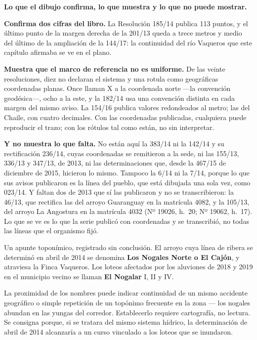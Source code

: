 \begin{cautela}
\textbf{Lo que el dibujo confirma, lo que muestra y lo que no puede mostrar.}

\textbf{Confirma dos cifras del libro.} La Resolución 185/14 publica 113 puntos, y el último punto de la margen derecha de la 201/13 queda a trece metros y medio del último de la ampliación de la 144/17: la continuidad del río Vaqueros que este capítulo afirmaba se ve en el plano.

\textbf{Muestra que el marco de referencia no es uniforme.} De las veinte resoluciones, diez no declaran el sistema y una rotula como geográficas coordenadas planas. Once llaman X a la coordenada norte ---la convención geodésica---, ocho a la este, y la 182/14 usa una convención distinta en cada margen del mismo aviso. La 154/16 publica valores redondeados al metro; las del Chaile, con cuatro decimales. Con las coordenadas publicadas, cualquiera puede reproducir el trazo; con los rótulos tal como están, no sin interpretar.

\textbf{Y no muestra lo que falta.} No están aquí la 383/14 ni la 142/14 y su rectificación 236/14, cuyas coordenadas se remitieron a la sede, ni las 155/13, 336/13 y 347/13, de 2013, ni las determinaciones que, desde la 467/15 de diciembre de 2015, hicieron lo mismo. Tampoco la 6/14 ni la 7/14, porque lo que sus avisos publicaron es la línea del pueblo, que está dibujada una sola vez, como 023/14. Y faltan dos de 2013 que sí las publicaron y no se transcribieron: la 46/13, que rectifica las del arroyo Guaranguay en la matrícula 4082, y la 105/13, del arroyo La Angostura en la matrícula 4032 (Nº 19026, h.\ 20; Nº 19062, h.\ 17). Lo que se ve es lo que la serie publicó con coordenadas y se transcribió, no todas las líneas que el organismo fijó.
\end{cautela}

\begin{cautela}
Un apunte toponímico, registrado sin conclusión. El arroyo cuya línea de ribera se determinó en abril de 2014 se denomina \textbf{Los Nogales Norte o El Cajón}, y atraviesa la Finca Vaqueros. Los loteos afectados por los aluviones de 2018 y 2019 en el municipio vecino se llaman \textbf{El Nogalar} I, II y IV.

La proximidad de los nombres puede indicar continuidad de un mismo accidente geográfico o simple repetición de un topónimo frecuente en la zona --- los nogales abundan en las yungas del corredor. Establecerlo requiere cartografía, no lectura. Se consigna porque, si se tratara del mismo sistema hídrico, la determinación de abril de 2014 alcanzaría a un curso vinculado a los loteos que se inundaron.
\end{cautela}

